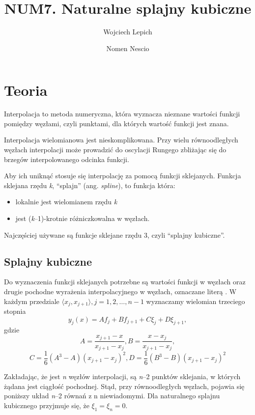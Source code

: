 \documentclass[a4paper,11pt]{article}
\author{Wojciech Lepich \and Nomen Nescio}
\title{NUM7. Naturalne splajny kubiczne}
\begin{document}
\maketitle

\section{Teoria}

Interpolacja to metoda numeryczna, która wyznacza nieznane wartości funkcji
pomiędzy węzłami, czyli punktami, dla których wartość funkcji jest znana.

Interpolacja wielomianowa jest nieskomplikowana. Przy wielu równoodległych 
węzłach interpolacji może prowadzić do oscylacji Rungego zbliżając się do
brzegów interpolowanego odcinka funkcji.

Aby ich uniknąć stosuje się interpolację za pomocą funkcji sklejanych.
Funkcja sklejana rzędu \textit{k}, ``splajn'' (ang. \textit{spline}), to funkcja
która:
\begin{itemize}
    \item lokalnie jest wielomianem rzędu \textit{k}
    \item jest (\textit{k}--1)-krotnie różniczkowalna w węzłach.
\end{itemize}

Najczęściej używane są funkcje sklejane rzędu 3, czyli ``splajny kubiczne''.

\subsection{Splajny kubiczne}

Do wyznaczenia funkcji sklejanych potrzebne są wartości funkcji w węzłach oraz
drugie pochodne wyrażenia interpolacyjnego w węzłach, oznaczane
literą \nolinebreak{\( \xi \)}. W każdym przedziale 
\(\langle x_j, x_{j+1} \rangle, j=1,2,\ldots,n-1 \) wyznaczamy wielomian
trzeciego stopnia
\[
    y_j(x) = Af_j + Bf_{j+1} + C\xi_j + D\xi_{j+1},
\] gdzie
\[
    A = \frac{x_{j+1}-x}{x_{j+1}-x_j}, B = \frac{x-x_j}{x_{j+1}-x_j},
\]
\[
    C = \frac{1}{6} (A^3-A) {(x_{j+1}-x_j)}^2,
    D = \frac{1}{6} (B^3-B) {(x_{j+1}-x_j)}^2
\]

Zakładając, że jest \textit{n} węzłów interpolacji, są \textit{n}--2 punktów
sklejania, w których żądana jest ciągłość pochodnej. Stąd, przy równoodległych
węzłach, pojawia się poniższy układ \textit{n}--2 równań z n niewiadomymi.
Dla naturalnego splajnu kubicznego przyjmuje się, że \(\xi_1 = \xi_n = 0\).
\end{document}
